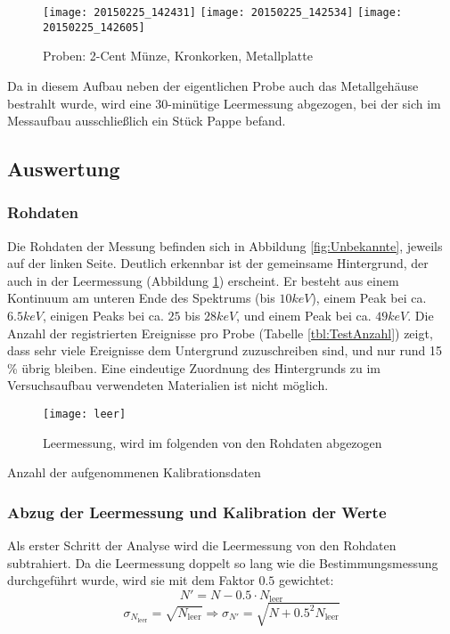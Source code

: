 \documentclass{../Misc/MontavonLaTeX/Montavon}
\newcommand{\thirdwidth}{0.32\textwidth}
\newcommand{\fullwidth}{1.0\textwidth}
\begin{document}
\begin{figure}
\centering
\texttt{[image: 20150225\_142431]}
\texttt{[image: 20150225\_142534]}
\texttt{[image: 20150225\_142605]}
\caption{Proben: 2-Cent Münze, Kronkorken, Metallplatte}
\end{figure}

Da in diesem Aufbau neben der eigentlichen Probe auch das Metallgehäuse bestrahlt wurde, wird eine 30-minütige Leermessung abgezogen, bei der sich im Messaufbau ausschließlich ein Stück Pappe befand.

\subsection{Auswertung}
\subsubsection{Rohdaten}
Die Rohdaten der Messung befinden sich in Abbildung \ref{fig:Unbekannte}, jeweils auf der linken Seite. Deutlich erkennbar ist der gemeinsame Hintergrund, der auch in der Leermessung (Abbildung \ref{fig:Leermessung}) erscheint. Er besteht aus einem Kontinuum am unteren Ende des Spektrums (bis $10 \unit{keV}$), einem Peak bei ca. $6.5 \unit{keV}$, einigen Peaks bei ca. $25$ bis $28 \unit{keV}$, und einem Peak bei ca. $49 \unit{keV}$. 
Die Anzahl der registrierten Ereignisse pro Probe (Tabelle \ref{tbl:TestAnzahl}) zeigt, dass sehr viele Ereignisse dem Untergrund zuzuschreiben sind, und nur rund 15 \% übrig bleiben.
Eine eindeutige Zuordnung des Hintergrunds zu im Versuchsaufbau verwendeten Materialien ist nicht möglich.

\begin{figure}[h]
\centering
\texttt{[image: leer]}
\caption{Leermessung, wird im folgenden von den Rohdaten abgezogen}
\label{fig:Leermessung}
\end{figure}

\begin{table}[h]
\centering

\caption{Anzahl der aufgenommenen Kalibrationsdaten}
\label{tbl:TestAnzahl}
\end{table}

\subsubsection{Abzug der Leermessung und Kalibration der Werte}
Als erster Schritt der Analyse wird die Leermessung von den Rohdaten subtrahiert. Da die Leermessung doppelt so lang wie die Bestimmungsmessung durchgeführt wurde, wird sie mit dem Faktor $0.5$ gewichtet:
\[ N' = N - 0.5 \cdot N_\textrm{leer} \]
\[ \sigma_{N_\textrm{leer}} = \sqrt{N_\textrm{leer}} \Rightarrow \sigma_{N'} = \sqrt{N + 0.5^2 N_\textrm{leer}}  \]
\end{document}
